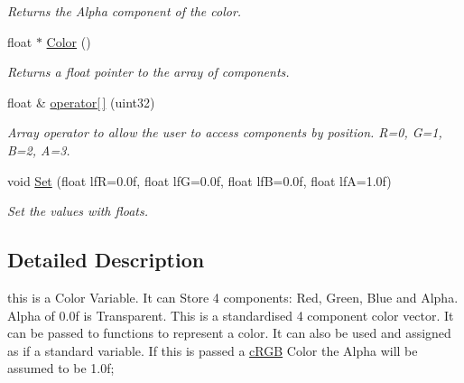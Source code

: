 \begin{DoxyCompactItemize}
\begin{DoxyCompactList}\small\item\em Returns the Alpha component of the color. \end{DoxyCompactList}\item 
\hypertarget{classc_r_g_b_a_a2a3ea2dda2ee1081011795f650955370}{
float $\ast$ \hyperlink{classc_r_g_b_a_a2a3ea2dda2ee1081011795f650955370}{Color} ()}
\label{classc_r_g_b_a_a2a3ea2dda2ee1081011795f650955370}

\begin{DoxyCompactList}\small\item\em Returns a float pointer to the array of components. \end{DoxyCompactList}\item 
\hypertarget{classc_r_g_b_a_aa6b05808b1fa55cb21cbcb6fba301580}{
float \& \hyperlink{classc_r_g_b_a_aa6b05808b1fa55cb21cbcb6fba301580}{operator\mbox{[}$\,$\mbox{]}} (uint32)}
\label{classc_r_g_b_a_aa6b05808b1fa55cb21cbcb6fba301580}

\begin{DoxyCompactList}\small\item\em Array operator to allow the user to access components by position. R=0, G=1, B=2, A=3. \end{DoxyCompactList}\item 
\hypertarget{classc_r_g_b_a_a22087ddfe6b9ae99617cbe5090d5439e}{
void \hyperlink{classc_r_g_b_a_a22087ddfe6b9ae99617cbe5090d5439e}{Set} (float lfR=0.0f, float lfG=0.0f, float lfB=0.0f, float lfA=1.0f)}
\label{classc_r_g_b_a_a22087ddfe6b9ae99617cbe5090d5439e}

\begin{DoxyCompactList}\small\item\em Set the values with floats. \end{DoxyCompactList}\end{DoxyCompactItemize}


\subsection{Detailed Description}
this is a Color Variable. It can Store 4 components: Red, Green, Blue and Alpha. Alpha of 0.0f is Transparent. This is a standardised 4 component color vector. It can be passed to functions to represent a color. It can also be used and assigned as if a standard variable. If this is passed a \hyperlink{classc_r_g_b}{cRGB} Color the Alpha will be assumed to be 1.0f; 